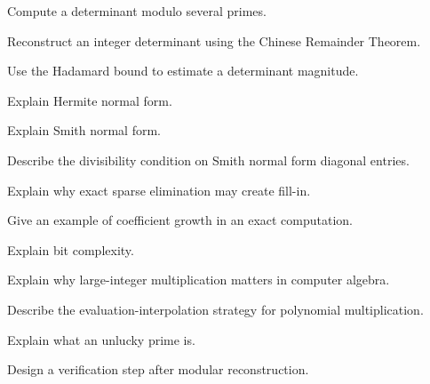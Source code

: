 \begin{exercise}[3]
Compute a determinant modulo several primes.
\end{exercise}

\begin{exercise}[3]
Reconstruct an integer determinant using the Chinese Remainder Theorem.
\end{exercise}

\begin{exercise}[3]
Use the Hadamard bound to estimate a determinant magnitude.
\end{exercise}

\begin{exercise}[3]
Explain Hermite normal form.
\end{exercise}

\begin{exercise}[3]
Explain Smith normal form.
\end{exercise}

\begin{exercise}[3]
Describe the divisibility condition on Smith normal form diagonal entries.
\end{exercise}

\begin{exercise}[3]
Explain why exact sparse elimination may create fill-in.
\end{exercise}

\begin{exercise}[3]
Give an example of coefficient growth in an exact computation.
\end{exercise}

\begin{exercise}[3]
Explain bit complexity.
\end{exercise}

\begin{exercise}[3]
Explain why large-integer multiplication matters in computer algebra.
\end{exercise}

\begin{exercise}[3]
Describe the evaluation-interpolation strategy for polynomial
multiplication.
\end{exercise}

\begin{exercise}[3]
Explain what an unlucky prime is.
\end{exercise}

\begin{exercise}[3]
Design a verification step after modular reconstruction.
\end{exercise}

